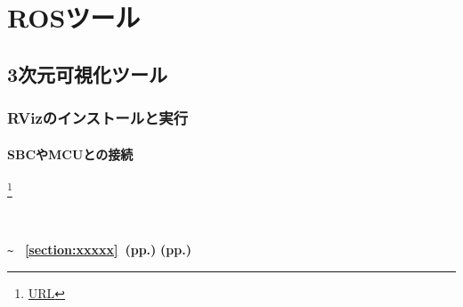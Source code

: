 \vspace{\baselineskip}
\noindent
\begin{description}
\item[]
\end{description}

\chapter{ROSツール}

\section{3次元可視化ツール}

\subsection{RVizのインストールと実行}

\subsubsection{SBCやMCUとの接続}


\footnote{\url{URL}}

\tiny
\scriptsize
\footnotesize
\small
\normalsize
\large
\Large
\LARGE
\huge
\Huge

\textbf{}
\\\\
\vspace{\baselineskip}
\noindent\textbf{}
\verb|~|
\label{section:xxxxx}
\textbf{~\ref{section:xxxxx}~(pp.\pageref{section:xxxxx})}
\textbf{(pp.\pageref{section:terms})}
